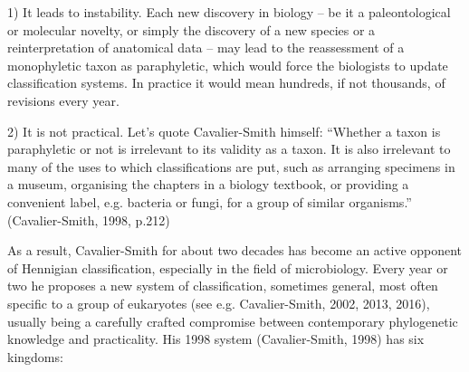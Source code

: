 \documentclass[a4paper]{article}
\begin{document}
1) It leads to instability. Each new discovery in biology – be it a paleontological or molecular novelty, or simply the
discovery of a new species or a reinterpretation of anatomical data – may lead to the reassessment of a monophyletic
taxon as paraphyletic, which would force the biologists to update classification systems. In practice it would mean
hundreds, if not thousands, of revisions every year.

2) It is not practical. Let’s quote Cavalier-Smith himself: “Whether a taxon is paraphyletic or not is irrelevant to its
validity as a taxon. It is also irrelevant to many of the uses to which classifications are put, such as arranging
specimens in a museum, organising the chapters in a biology textbook, or providing a convenient label, e.g. bacteria or
fungi, for a group of similar organisms.” \label{ref:RNDUlTuwI9YEO}(Cavalier-Smith, 1998, p.212)

As a result, Cavalier-Smith for about two decades has become an active opponent of Hennigian classification, especially
in the field of microbiology. Every year or two he proposes a new system of classification, sometimes general, most
often specific to a group of eukaryotes \label{ref:RNDtoAIslWhri}(see e.g. Cavalier-Smith, 2002, 2013, 2016), usually
being a carefully crafted compromise between contemporary phylogenetic knowledge and practicality. His 1998 system
\label{ref:RNDJbJ6dU4tG1}(Cavalier-Smith, 1998) has six kingdoms:
\end{document}
